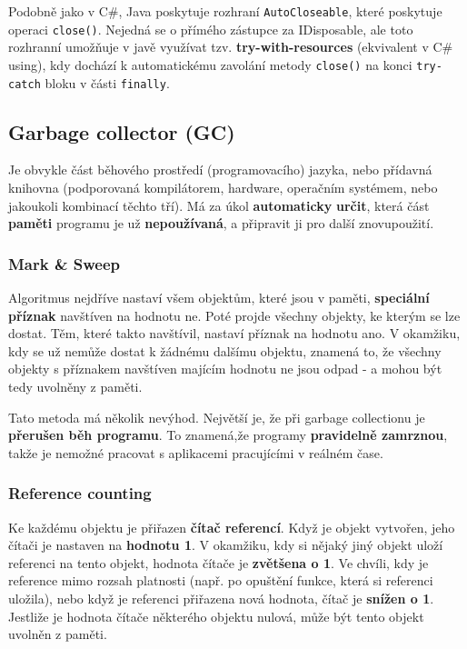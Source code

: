 Podobně jako v C\#, Java poskytuje rozhraní \texttt{AutoCloseable}, které poskytuje operaci \texttt{close()}. Nejedná se o přímého zástupce za IDisposable, ale toto rozhranní umožňuje v javě využívat tzv. \textbf{try-with-resources} (ekvivalent v C\# using), kdy dochází k automatickému zavolání metody \texttt{close()} na konci \texttt{try-catch} bloku v části \texttt{finally}.

\subsection{Garbage collector (GC)}
Je obvykle část běhového prostředí (programovacího) jazyka, nebo přídavná knihovna (podporovaná kompilátorem, hardware, operačním systémem, nebo jakoukoli kombinací těchto tří). Má za úkol \textbf{automaticky} \textbf{určit}, která část \textbf{paměti} programu je už \textbf{nepoužívaná}, a připravit ji pro další znovupoužití.

\subsubsection{Mark \& Sweep}
Algoritmus nejdříve nastaví všem objektům, které jsou v paměti, \textbf{speciální příznak} navštíven na hodnotu ne. Poté projde všechny objekty, ke kterým se lze dostat. Těm, které takto navštívil, nastaví příznak na hodnotu ano. V okamžiku, kdy se už nemůže dostat k žádnému dalšímu objektu, znamená to, že všechny objekty s příznakem navštíven majícím hodnotu ne jsou odpad - a mohou být tedy uvolněny z paměti.

Tato metoda má několik nevýhod. Největší je, že při garbage collectionu je \textbf{přerušen běh programu}. To znamená,že programy \textbf{pravidelně zamrznou}, takže je nemožné pracovat s aplikacemi pracujícími v reálném čase.

\subsubsection{Reference counting}
Ke každému objektu je přiřazen \textbf{čítač referencí}. Když je objekt vytvořen, jeho čítači je nastaven na \textbf{hodnotu 1}. V okamžiku, kdy si nějaký jiný objekt uloží referenci na tento objekt, hodnota čítače je \textbf{zvětšena o 1}. Ve chvíli, kdy je reference mimo rozsah platnosti (např. po opuštění funkce, která si referenci uložila), nebo když je referenci přiřazena nová hodnota, čítač je \textbf{snížen o 1}. Jestliže je hodnota čítače některého objektu nulová, může být tento objekt uvolněn z paměti.

